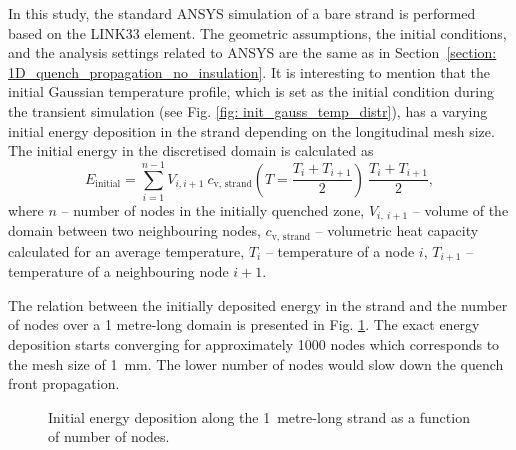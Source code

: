
In this study, the standard ANSYS simulation of a bare strand is performed based on the LINK33 element. The geometric assumptions, the initial conditions, and the analysis settings related to ANSYS are the same as in Section~\ref{section: 1D_quench_propagation_no_insulation}. It is interesting to mention that the initial Gaussian temperature profile, which is set as the initial condition during the transient simulation (see Fig. \ref{fig: init_gauss_temp_distr}), has a varying initial energy deposition in the strand depending on the longitudinal mesh size. The initial energy in the discretised domain is calculated as
\begin{equation}
    E_\text{initial} = \sum_{i=1}^{n-1} V_{i,i+1}~c_\text{v, strand}\left(T = \frac{T_i+T_{i+1}}{2}\right)~\frac{T_i+T_{i+1}}{2},
\end{equation}
where $n$ -- number of nodes in the initially quenched zone, $V_{i,~i+1}$ -- volume of the domain between two neighbouring nodes, $c_\text{v, strand}$ -- volumetric heat capacity calculated for an average temperature, $T_i$ -- temperature of a node $i$, $T_{i+1}$ -- temperature of a neighbouring node $i+1$.

The relation between the initially deposited energy in the strand and the number of nodes over a 1 metre-long domain is presented in Fig. \ref{fig: q_vel_modelling_energy_deposition}. The exact energy deposition starts converging for approximately 1000 nodes which corresponds to the mesh size of 1~mm. The lower number of nodes would slow down the quench front propagation.

\begin{figure}[H]
    \centering
    \caption{Initial energy deposition along the 1~metre-long strand as a function of number of nodes.}
    \label{fig: q_vel_modelling_energy_deposition}
\end{figure}

